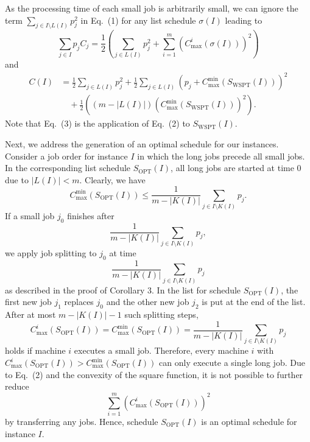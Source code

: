 \documentclass[11pt]{article}
\newcommand{\WSPT}{\mathrm{WSPT}}
\newcommand{\OPT}{\mathrm{OPT}}
\newcommand{\Cmin}{C_{\max}^{\min}}
\begin{document}
As the processing time of each small job is arbitrarily small, we can ignore
the term $\sum_{j\in I\setminus L(I)}p_j^2$ in Eq.~(1) for any list schedule
$\sigma(I)$ leading to
\begin{equation}
        \sum_{j\in I}p_j C_j
        =
        \frac12
        \left(
            \sum_{j\in L(I)}p_j^2
            +
            \sum_{i=1}^m(C_{\max}^i(\sigma(I)))^2
        \right)
\end{equation}
and
\begin{equation}
\begin{aligned}
        C(I)
        &=
        \frac12\sum_{j\in L(I)}p_j^2
        +
        \frac12\sum_{j\in L(I)}
            (p_j+\Cmin(S_{\WSPT}(I)))^2                    \\
        &\quad
        +
        \frac12\left((m-|L(I)|)(\Cmin(S_{\WSPT}(I)))^2\right).
\end{aligned}
\end{equation}
Note that Eq.~(3) is the application of Eq.~(2) to $S_{\WSPT}(I)$.

Next, we address the generation of an optimal schedule for our instances.
Consider a job order for instance $I$ in which the long jobs precede all small
jobs. In the corresponding list schedule $S_{\OPT}(I)$, all long jobs are
started at time 0 due to $|L(I)|<m$. Clearly, we have
\[
        \Cmin(S_{\OPT}(I))
        \leq
        \frac1{m-|K(I)|}\sum_{j\in I\setminus K(I)}p_j .
\]
If a small job $j_0$ finishes after
\[
        \frac1{m-|K(I)|}\sum_{j\in I\setminus K(I)}p_j ,
\]
we apply job splitting to $j_0$ at time
\[
        \frac1{m-|K(I)|}\sum_{j\in I\setminus K(I)}p_j
\]
as described in the proof of Corollary 3. In the list for schedule
$S_{\OPT}(I)$, the first new job $j_1$ replaces $j_0$ and the other new job
$j_2$ is put at the end of the list. After at most $m-|K(I)|-1$ such
splitting steps,
\[
        C_{\max}^i(S_{\OPT}(I))
        =
        \Cmin(S_{\OPT}(I))
        =
        \frac1{m-|K(I)|}\sum_{j\in I\setminus K(I)}p_j
\]
holds if machine $i$ executes a small job. Therefore, every machine $i$ with
$C_{\max}^i(S_{\OPT}(I))>\Cmin(S_{\OPT}(I))$ can only execute a single long
job. Due to Eq.~(2) and the convexity of the square function, it is not
possible to further reduce
\[
        \sum_{i=1}^m(C_{\max}^i(S_{\OPT}(I)))^2
\]
by transferring any jobs. Hence, schedule $S_{\OPT}(I)$ is an optimal
schedule for instance $I$.
\end{document}
